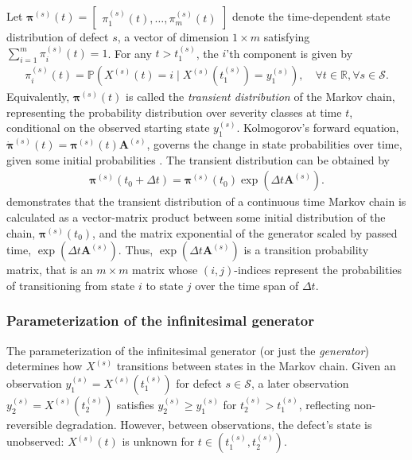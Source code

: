 Let $\bm{\pi}^{(s)}(t) = \begin{bmatrix} \pi^{(s)}_1(t), \dots, \pi^{(s)}_m(t) \end{bmatrix}$ denote the time-dependent state distribution of defect $s$, a vector of dimension $1 \times m$ satisfying $\sum_{i = 1}^m \pi^{(s)}_i(t) = 1$. For any $t>t_1^{(s)}$, the $i$'th component is given by
\begin{align}
\pi_i^{(s)}(t) = \mathds{P} \left( X^{(s)}(t) = i \mid X^{(s)}(t_1^{(s)}) = y_1^{(s)}  \right), \quad \forall t\in \mathbb{R}, \forall s \in \mathcal{S}. \label{eq:transient_dist} 
\end{align}
Equivalently, $\bm{\pi}^{(s)}(t)$ is called the \textit{transient distribution} of the Markov chain, representing the probability distribution over severity classes at time $t$, conditional on the observed starting state $y_1^{(s)}$.
Kolmogorov's forward equation, $\Dot{\bm{\pi}}^{(s)}(t) = \bm{\pi}^{(s)}(t) \bm{A}^{(s)}$, governs the change in state probabilities over time, given some initial probabilities \citep[Section 1.3]{bladt_nielsen}. The transient distribution can be obtained by
\begin{equation}
\begin{aligned}
                  \bm{\pi}^{(s)}(t_0 + \Delta t) = 
                  \bm{\pi}^{(s)}(t_0) \exp{ ( \Delta t \bm{A}^{(s)} ) }. \label{eq:markov_eq_solution}
\end{aligned}     
\end{equation}
 demonstrates that the transient distribution of a continuous time Markov chain is calculated as a vector-matrix product between some initial distribution of the chain, $\bm{\pi}^{(s)}(t_0)$, and the matrix exponential of the generator scaled by passed time, $\exp{ ( \Delta t \bm{A}^{(s)} ) }$. Thus, $\exp{ ( \Delta t \bm{A}^{(s)} ) }$ is a transition probability matrix, that is an $m \times m$ matrix whose $(i,j)$-indices represent the probabilities of transitioning from state $i$ to state $j$ over the time span of $\Delta t$.

\subsubsection{Parameterization of the infinitesimal generator} \label{sec:generator_params}
The parameterization of the infinitesimal generator (or just the \textit{generator}) determines how $X^{(s)}$ transitions between states in the Markov chain. 
Given an observation $y_1^{(s)} = X^{(s)}\left(t_1^{(s)}\right)$ for defect $s \in \mathcal{S}$, a later observation $y_2^{(s)} = X^{(s)}\left(t_2^{(s)}\right)$ satisfies $y_2^{(s)} \geq y_1^{(s)}$ for $t_2^{(s)} > t_1^{(s)}$, reflecting non-reversible degradation. However, between observations, the defect’s state is unobserved: $X^{(s)}(t)$ is unknown for $t \in \left(t_1^{(s)}, t_2^{(s)}\right)$.

